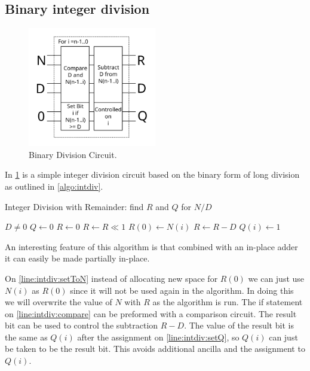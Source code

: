  \subsection{Binary integer division}
    \begin{figure}
      \capstart
      \centering
      \includegraphics[width=0.5\textwidth]{images/division}
      \caption{Binary Division Circuit.}
      \label{fig:div}
     \end{figure}
  In \cref{fig:div} is a simple integer division circuit based on the binary
  form of long division as outlined in \cref{algo:intdiv}.
    \begin{program}
      \capstart
      \caption{Integer Division with Remainder: find $R$ and $Q$ for $N/D$}
      \begin{algorithmic}[1]
        \Require $D \neq 0$
        \State $Q \gets 0$
        \State $R \gets 0$
          \State $R \gets R \ll 1$
          \State $R(0) \gets N(i)$ \label{line:intdiv:setToN}
           \label{line:intdiv:compare}
            \State $R\gets R - D$
            \State $Q(i) \gets 1$ \label{line:intdiv:setQ}
          \EndIf
        \EndFor
      \end{algorithmic}
      \label{algo:intdiv}
    \end{program}
    An interesting feature of this algorithm is that combined with an in-place adder\cite{CDKM:2004} it can easily be made partially in-place.

    On \cref{line:intdiv:setToN} instead of allocating new space for $R(0)$ we can just use $N(i)$ as $R(0)$ since it will not be used again in the algorithm.
    In doing this we will overwrite the value of $N$ with $R$ as the algorithm is run.
    The if statement on \cref{line:intdiv:compare} can be preformed with a comparison circuit.
    The result bit can be used to control the subtraction $R-D$.
    The value of the result bit is the same as $Q(i)$ after the assignment on \cref{line:intdiv:setQ}, so $Q(i)$ can just be taken to be the result bit.
    This avoids additional ancilla and the assignment to $Q(i)$.

